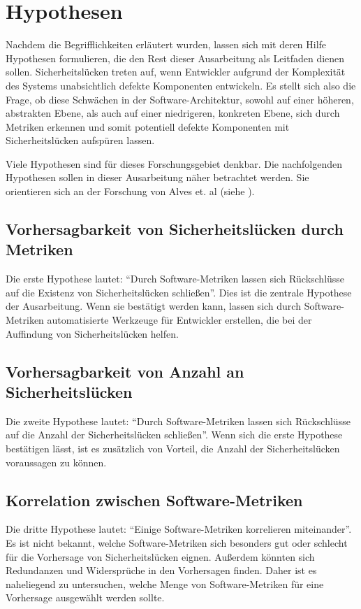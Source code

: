 \section{Hypothesen}
\label{sec:hypothesen}
Nachdem die Begrifflichkeiten erläutert wurden, lassen sich mit deren Hilfe Hypothesen formulieren, die den Rest dieser Ausarbeitung als Leitfaden dienen sollen.
Sicherheitslücken treten auf, wenn Entwickler aufgrund der Komplexität des Systems unabsichtlich defekte Komponenten entwickeln.
Es stellt sich also die Frage, ob diese Schwächen in der Software-Architektur,
sowohl auf einer höheren, abstrakten Ebene, als auch auf einer niedrigeren, konkreten Ebene,
sich durch Metriken erkennen und somit potentiell defekte Komponenten mit Sicherheitslücken aufspüren lassen.

Viele Hypothesen sind für dieses Forschungsgebiet denkbar.
Die nachfolgenden Hypothesen sollen in dieser Ausarbeitung näher betrachtet werden.
Sie orientieren sich an der Forschung von Alves et. al (siehe \cite{alves_et_al}).

\subsection{Vorhersagbarkeit von Sicherheitslücken durch Metriken}
Die erste Hypothese lautet: "`Durch Software-Metriken lassen sich Rückschlüsse auf die Existenz von Sicherheitslücken schließen"'.
Dies ist die zentrale Hypothese der Ausarbeitung.
Wenn sie bestätigt werden kann, lassen sich durch Software-Metriken automatisierte Werkzeuge für Entwickler erstellen, die bei der Auffindung von Sicherheitslücken helfen.

\subsection{Vorhersagbarkeit von Anzahl an Sicherheitslücken}
Die zweite Hypothese lautet: "`Durch Software-Metriken lassen sich Rückschlüsse auf die Anzahl der Sicherheitslücken schließen"'.
Wenn sich die erste Hypothese bestätigen lässt, ist es zusätzlich von Vorteil, die Anzahl der Sicherheitslücken voraussagen zu können.

\subsection{Korrelation zwischen Software-Metriken}
Die dritte Hypothese lautet: "`Einige Software-Metriken korrelieren miteinander"'.
Es ist nicht bekannt, welche Software-Metriken sich besonders gut oder schlecht für die Vorhersage von Sicherheitslücken eignen.
Außerdem könnten sich Redundanzen und Widersprüche in den Vorhersagen finden.
Daher ist es naheliegend zu untersuchen, welche Menge von Software-Metriken für eine Vorhersage ausgewählt werden sollte.
